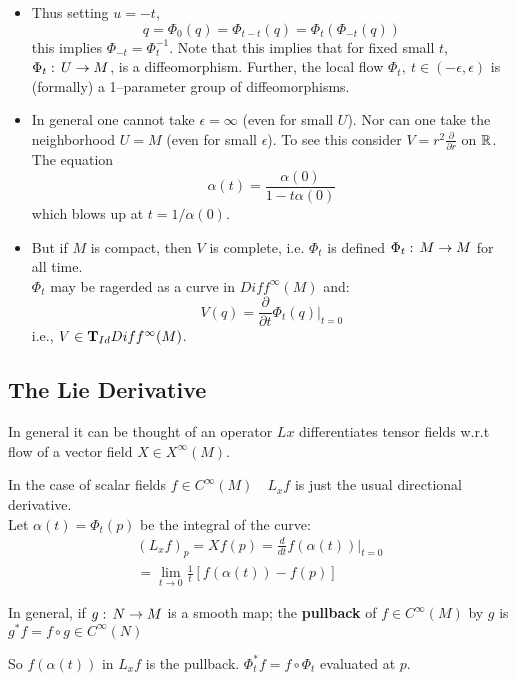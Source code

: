     \begin{remarks}
        \begin{itemize}
            \item Thus setting $u=-t$, 
    $$q= \Phi_0(q) = \Phi_{t-t} (q) = \Phi_t(\Phi_{-t}(q) ) $$
    this implies $\Phi_{-t} = \Phi_t^{-1}$. Note that this implies that for fixed small $t$, $\Phi_t :\, U \to M$, is a diffeomorphism. Further, the local flow $\Phi_t,\ t\in (-\epsilon,\epsilon)$ is (formally) a 1--parameter group of diffeomorphisms.
\item In general one cannot take $\epsilon = \infty$ (even for small $U$). Nor can one take the neighborhood $U=M$ (even for small $\epsilon$). To see this consider $V=r^2 \frac{\partial}{\partial r} $ on $\mathbb{R}$. The equation 
    $$\alpha(t) = \frac{\alpha(0)}{1- t \alpha(0)}$$
    which blows up at $t= 1/\alpha(0)$. 
\item But if $M$ is compact, then $V$ is complete, i.e. $\Phi_t$ is defined $\Phi_t:\, M\to M$ for all time. \\
    $\Phi_t$ may be ragerded as a curve in $Diff^\infty (M)$ and:
    $$V(q) = \frac{\partial}{\partial t}  \Phi_t(q) |_{t=0}$$
    i.e., $V\in \text{\textbf{T}}_{Id} Diff^\infty (M)$.
    \end{itemize}
\end{remarks}

    \subsection{The Lie Derivative}
    In general it can be thought of an operator $Lx$ differentiates tensor fields w.r.t flow of a vector field $X\in X^\infty(M)$.

    In the case of scalar fields $f\in C^\infty(M)\quad L_xf$ is just the usual directional derivative.\\
    Let $\alpha(t) = \Phi_t(p)$ be the integral of the curve:
    \begin{gather}
    (L_xf)_p = Xf(p) = \frac{d}{dt}f(\alpha(t))|_{t=0}\\
    = \lim_{t\to 0} \frac{1}{t} \left[ f(\alpha(t)) - f(p) \right] \label{numero1}
\end{gather}

\begin{ddef}
    In general, if $g:\, N\to M$ is a smooth map; the \textbf{pullback} of $f\in C^\infty(M)$ by $g$ is $g^*f=f\circ g\in C^\infty(N)$ 
\end{ddef}

So $f(\alpha(t))$ in  $L_xf$ is the pullback. $\Phi_t^* f = f\circ \Phi_t$ evaluated at $p$.

